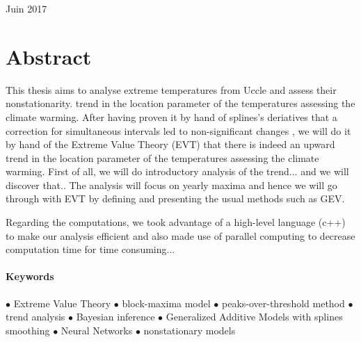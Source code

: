 \documentclass[11pt,a4paper,openany ]{book}
\begin{document}
\vspace{1,5cm}



\begin{center}
	{\large Juin 2017}
\end{center}
\thispagestyle{empty}
\newpage


{}
\vspace*{\fill}
\section*{\centering Abstract}
\begin{tcolorbox}%
This thesis aims to analyse extreme temperatures from Uccle and assess their nonstationarity. trend in the location parameter of the temperatures assessing the climate warming.   
After having proven it by hand of splines's deriatives that a correction for simultaneous intervals led to non-significant changes , we will do it by hand of the Extreme Value Theory (EVT)  that there is indeed an upward trend in the location parameter of the temperatures assessing the climate warming. First of all, we will do introductory analysis of the trend... and we will discover that..  The analysis will focus on yearly maxima and hence we will go through with EVT by defining and presenting the usual methods such as GEV. 

Regarding the computations, we took advantage of a high-level language (c++) to make our analysis efficient and also made use of parallel computing to decrease computation time for time consuming...
\thispagestyle{empty}
\end{tcolorbox}

\vspace{.3cm}

\paragraph*{Keywords} $\bullet$ Extreme Value Theory   $\bullet$ block-maxima model  $\bullet$ peaks-over-threshold method $\bullet$ trend analysis $\bullet$ Bayesian inference   $\bullet$ Generalized Additive Models with splines smoothing  $\bullet$ Neural Networks  $\bullet$ nonstationary models 
\vspace*{\fill}

\newpage


\end{document}
